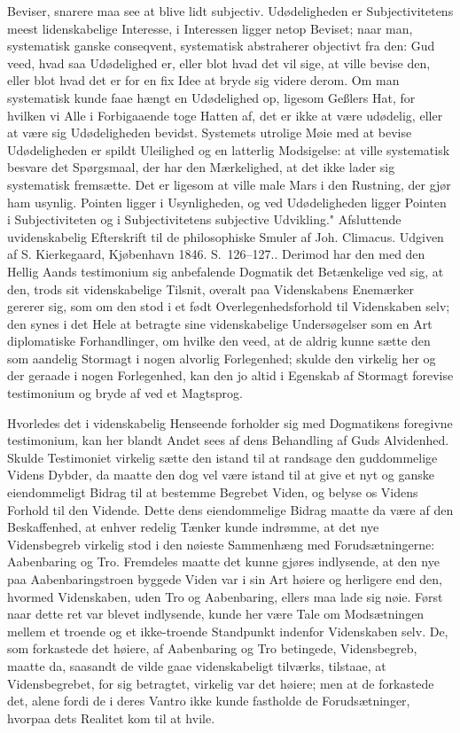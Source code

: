 \documentclass[12pt]{book}
\newcommand{\opage}[1]{\marginnote{\footnotesize\textit{[#1]}}}
\begin{document}
{Beviser, snarere maa see at blive lidt subjectiv. Udødeligheden er
Subjectivitetens meest lidenskabelige Interesse, i Interessen ligger netop
Beviset; naar man, systematisk ganske conseqvent, systematisk abstraherer
objectivt fra den: Gud veed, hvad saa Udødelighed er, eller blot hvad det vil
sige, at ville bevise den, eller blot hvad det er for en fix Idee at bryde sig
videre derom. Om man systematisk kunde faae hængt en Udødelighed op, ligesom
Geßlers Hat, for hvilken vi Alle i Forbigaaende toge Hatten af, det er ikke at
være udødelig, eller at være sig Udødeligheden bevidst. Systemets utrolige Møie
med at bevise Udødeligheden er spildt Uleilighed og en latterlig Modsigelse: at
ville systematisk besvare det Spørgsmaal, der har den Mærkelighed, at det ikke
lader sig systematisk fremsætte. Det er ligesom at ville male Mars i den Rustning,
der gjør ham usynlig. Pointen ligger i Usynligheden, og ved Udødeligheden ligger
Pointen i Subjectiviteten og i Subjectivitetens subjective Udvikling."
Afsluttende uvidenskabelig Efterskrift til de philosophiske Smuler af Joh.
Climacus. Udgiven af S. Kierkegaard, Kjøbenhavn 1846. S.~126--127.}.
\opage{48} Derimod har den med den Hellig Aands testimonium sig anbefalende Dogmatik det
Betænkelige ved sig, at den, trods sit videnskabelige Tilsnit, overalt paa
Videnskabens Enemærker gererer sig, som om den stod i et født
Overlegenhedsforhold til Videnskaben selv; den synes i det Hele at betragte sine
videnskabelige Undersøgelser som en Art diplomatiske Forhandlinger, om hvilke den
veed, at de aldrig kunne sætte den som aandelig Stormagt i nogen alvorlig
Forlegenhed; skulde den virkelig her og der geraade i nogen Forlegenhed, kan den
jo altid i Egenskab af Stormagt forevise testimonium og bryde af ved et
Magtsprog.

Hvorledes det i videnskabelig Henseende forholder sig med Dogmatikens foregivne
testimonium, kan her blandt Andet sees af dens Behandling af Guds Alvidenhed.
Skulde Testimoniet virkelig sætte den istand til at randsage den guddommelige
Videns Dybder, da maatte den dog vel være istand til at give et nyt og ganske
eiendommeligt Bidrag til at
\opage{49} bestemme Begrebet Viden, og belyse os Videns Forhold til den Vidende. Dette dens
eiendommelige Bidrag maatte da være af den Beskaffenhed, at enhver redelig Tænker
kunde indrømme, at det nye Vidensbegreb virkelig stod i den nøieste Sammenhæng
med Forudsætningerne: Aabenbaring og Tro. Fremdeles maatte det kunne gjøres
indlysende, at den nye paa Aabenbaringstroen byggede Viden var i sin Art høiere og
herligere end den, hvormed Videnskaben, uden Tro og Aabenbaring, ellers maa lade
sig nøie. Først naar dette ret var blevet indlysende, kunde her være Tale om
Modsætningen mellem et troende og et ikke-troende Standpunkt indenfor Videnskaben
selv. De, som forkastede det høiere, af Aabenbaring og Tro betingede,
Vidensbegreb, maatte da, saasandt de vilde gaae videnskabeligt tilværks, tilstaae,
at Vidensbegrebet, for sig betragtet, virkelig var det høiere; men at de
forkastede det, alene fordi de i deres Vantro ikke kunde fastholde de
Forudsætninger, hvorpaa dets Realitet kom til at hvile.
\end{document}
